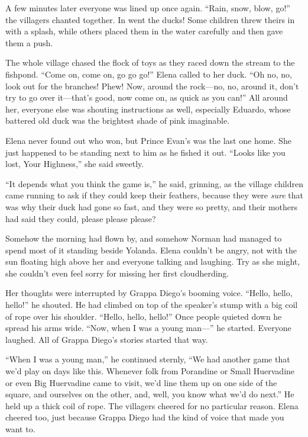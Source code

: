 \documentclass[10pt]{book}
\begin{document}
A few minutes later everyone was lined up once again. ``Rain, snow, blow, go!'' the villagers chanted together. In went the ducks! Some children threw theirs in with a splash, while others placed them in the water carefully and then gave them a push.

The whole village chased the flock of toys as they raced down the stream to the fishpond. ``Come on, come on, go go go!'' Elena called to her duck. ``Oh no, no, look out for the branches! Phew! Now, around the rock---no, no, around it, don't try to go over it---that's good, now come on, as quick as you can!'' All around her, everyone else was shouting instructions as well, especially Eduardo, whose battered old duck was the brightest shade of pink imaginable.

Elena never found out who won, but Prince Evan's was the last one home. She just happened to be standing next to him as he fished it out. ``Looks like you lost, Your Highness,'' she said sweetly.

``It depends what you think the game is,'' he said, grinning, as the village children came running to ask if they could keep their feathers, because they were \emph{sure} that was why their duck had gone so fast, and they were so pretty, and their mothers had said they could, please please please?

Somehow the morning had flown by, and somehow Norman had managed to spend most of it standing beside Yolanda. Elena couldn't be angry, not with the sun floating high above her and everyone talking and laughing. Try as she might, she couldn't even feel sorry for missing her first cloudherding.

Her thoughts were interrupted by Grappa Diego's booming voice. ``Hello, hello, hello!'' he shouted. He had climbed on top of the speaker's stump with a big coil of rope over his shoulder. ``Hello, hello, hello!'' Once people quieted down he spread his arms wide. ``Now, when I was a young man---'' he started. Everyone laughed. All of Grappa Diego's stories started that way.

``When I was a young man,'' he continued sternly, ``We had another game that we'd play on days like this. Whenever folk from Porandine or Small Huervadine or even Big Huervadine came to visit, we'd line them up on one side of the square, and ourselves on the other, and, well, you know what we'd do next.'' He held up a thick coil of rope. The villagers cheered for no particular reason. Elena cheered too, just because Grappa Diego had the kind of voice that made you want to.
\end{document}
